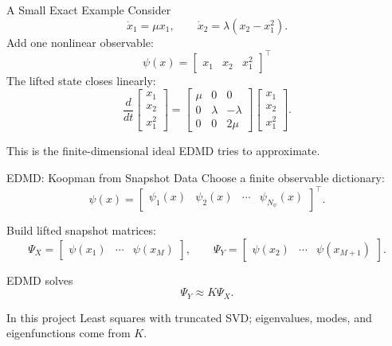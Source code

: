 \documentclass[aspectratio=169,10pt]{beamer}
\begin{document}
\begin{frame}{A Small Exact Example}
    Consider
    \[
        \dot{x}_1 = \mu x_1,
        \qquad
        \dot{x}_2 = \lambda(x_2 - x_1^2).
    \]
    Add one nonlinear observable:
    \[
        \psi(x) =
        \begin{bmatrix}
            x_1 & x_2 & x_1^2
        \end{bmatrix}^{\top}
    \]
    The lifted state closes linearly:
    \[
        \frac{d}{dt}
        \begin{bmatrix}
            x_1 \\ x_2 \\ x_1^2
        \end{bmatrix}
        =
        \begin{bmatrix}
            \mu & 0 & 0 \\
            0 & \lambda & -\lambda \\
            0 & 0 & 2\mu
        \end{bmatrix}
        \begin{bmatrix}
            x_1 \\ x_2 \\ x_1^2
        \end{bmatrix}.
    \]

    \vspace{0.1cm}
    This is the finite-dimensional ideal EDMD tries to approximate.
\end{frame}

\begin{frame}{EDMD: Koopman from Snapshot Data}
    Choose a finite observable dictionary:
    \[
        \psi(x) =
        \begin{bmatrix}
            \psi_1(x) & \psi_2(x) & \cdots & \psi_{N_\psi}(x)
        \end{bmatrix}^{\top}.
    \]

    Build lifted snapshot matrices:
    \[
        \Psi_X =
        \begin{bmatrix}
            \psi(x_1) & \cdots & \psi(x_M)
        \end{bmatrix},
        \qquad
        \Psi_Y =
        \begin{bmatrix}
            \psi(x_2) & \cdots & \psi(x_{M+1})
        \end{bmatrix}.
    \]

    EDMD solves
    \[
        \Psi_Y \approx K \Psi_X.
    \]

    \vspace{0.15cm}
    \begin{block}{In this project}
        Least squares with truncated SVD; eigenvalues, modes, and eigenfunctions come from \(K\).
    \end{block}
\end{frame}
\end{document}

